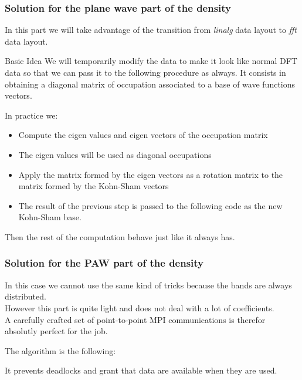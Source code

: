 \begin{frame}
  \frametitle{Solution for the plane wave part of the density}
  In this part we will take advantage of the transition from \emph{linalg}
  data layout to \emph{fft} data layout.
  
  \begin{block}{Basic Idea}
    We will temporarily modify the data to make it look like normal DFT data so
    that we can pass it to the following procedure as always.
    It consists in obtaining a diagonal matrix of occupation associated to
    a base of wave functions vectors.
  \end{block}
\end{frame}

\begin{frame}
  In practice we:
  \begin{itemize}
    \item Compute the eigen values and eigen vectors of the occupation matrix
    \item The eigen values will be used as diagonal occupations 
    \item Apply the matrix formed by the eigen vectors as a rotation matrix to
      the matrix formed by the Kohn-Sham vectors
    \item The result of the previous step is passed to the following code as the new
      Kohn-Sham base.
  \end{itemize}

  Then the rest of the computation behave just like it always has.
\end{frame}

\begin{frame}
  \frametitle{Solution for the PAW part of the density}
  In this case we cannot use the same kind of tricks because the bands are
  always distributed.\\
  However this part is quite light and does not deal with a lot of coefficients.\\
  A carefully crafted set of point-to-point MPI communications is therefor absolutly
  perfect for the job.
\end{frame}


\begin{frame}[fragile]
  The algorithm is the following:
  \begin{algorithm}[H]
  \end{algorithm}
  It prevents deadlocks and grant that data are available when they are used.
\end{frame}
